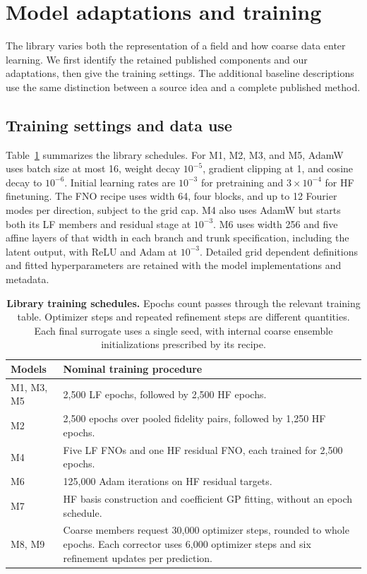 \section{Model adaptations and training}
\label{app:protocol}
The library varies both the representation of a field and how coarse data
enter learning. We first identify the retained published components and our
adaptations, then give the training settings. The additional baseline
descriptions use the same distinction between a source idea and a complete
published method.



\subsection{Training settings and data use}
\label{app:experts}
Table~\ref{tab:training} summarizes the library schedules. For M1, M2, M3,
and M5, AdamW uses batch size at most 16, weight decay $10^{-5}$, gradient
clipping at 1, and cosine decay to $10^{-6}$. Initial learning rates are
$10^{-3}$ for pretraining and $3\times10^{-4}$ for HF finetuning. The FNO
recipe uses width 64, four blocks, and up to 12 Fourier modes per direction,
subject to the grid cap. M4 also uses AdamW but starts both its LF members
and residual stage at $10^{-3}$. M6 uses width 256 and five affine layers of
that width in each branch and trunk specification, including the latent output,
with ReLU and Adam at $10^{-3}$. Detailed grid dependent definitions and fitted
hyperparameters are retained with the model implementations and metadata.

\begin{table}[h!]
\centering\small\setlength{\tabcolsep}{4pt}
\caption{\textbf{Library training schedules.} Epochs count passes through the
relevant training table. Optimizer steps and repeated refinement steps are
different quantities. Each final surrogate uses a single seed, with internal
coarse ensemble initializations prescribed by its recipe.}
\label{tab:training}
\begin{tabular}{p{.16\linewidth}p{.72\linewidth}}
\toprule
Models & Nominal training procedure \\
\midrule
M1, M3, M5 & 2,500 LF epochs, followed by 2,500 HF epochs. \\
M2 & 2,500 epochs over pooled fidelity pairs, followed by 1,250 HF epochs. \\
M4 & Five LF FNOs and one HF residual FNO, each trained for 2,500 epochs. \\
M6 & 125,000 Adam iterations on HF residual targets. \\
M7 & HF basis construction and coefficient GP fitting, without an epoch schedule. \\
M8, M9 & Coarse members request 30,000 optimizer steps, rounded to whole epochs.
Each corrector uses 6,000 optimizer steps and six refinement updates per prediction. \\
\bottomrule
\end{tabular}
\end{table}

